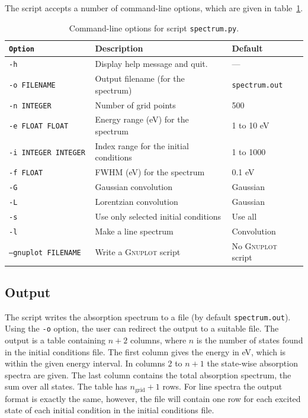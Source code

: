 \documentclass[a4paper,11pt,DIV=15,openany,twoside=false]{scrbook}
\newcommand{\ttt}[1]{\texttt{#1}}
\begin{document}
The script accepts a number of command-line options, which are given in table~\ref{tab:spectrum_opts}.
\begin{table}
  \centering
  \caption{Command-line options for script \ttt{spectrum.py}.}
  \label{tab:spectrum_opts}
  \begin{tabular}{>{\tt}lll}
    \toprule
    \rmfamily Option        &Description      &Default\\
    \midrule
    -h                  &Display help message and quit.         &---       \\
    -o FILENAME         &Output filename (for the spectrum)     &\ttt{spectrum.out}\\
    -n INTEGER          &Number of grid points                  &500       \\
    -e FLOAT FLOAT      &Energy range (eV) for the spectrum     &1 to 10 eV\\
    -i INTEGER INTEGER  &Index range for the initial conditions &1 to 1000\\
    -f FLOAT            &FWHM (eV) for the spectrum             &0.1 eV\\
    -G                  &Gaussian convolution                   &Gaussian\\
    -L                  &Lorentzian convolution                 &Gaussian\\
    -s                  &Use only selected initial conditions   &Use all\\
    -l                  &Make a line spectrum                   &Convolution\\
    --gnuplot FILENAME  &Write a \textsc{Gnuplot} script        &No \textsc{Gnuplot} script\\
    \bottomrule
  \end{tabular}
\end{table}

\subsection{Output}

The script writes the absorption spectrum to a file (by default \ttt{spectrum.out}). Using the \ttt{-o} option, the user can redirect the output to a suitable file. The output is a table containing $n+2$ columns, where $n$ is the number of states found in the initial conditions file. The first column gives the energy in eV, which is within the given energy interval. In columns 2 to $n+1$ the state-wise absorption spectra are given. The last column contains the total absorption spectrum, the sum over all states. The table has $n_{\text{grid}}+1$ rows. For line spectra the output format is exactly the same, however, the file will contain one row for each excited state of each initial condition in the initial conditions file.
\end{document}
